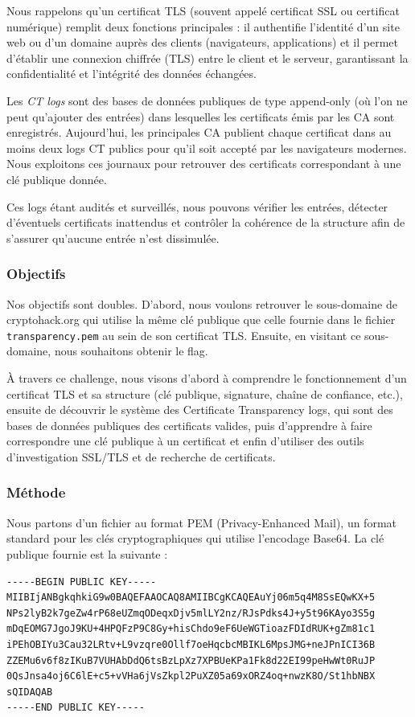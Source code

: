Nous rappelons qu'un certificat TLS (souvent appelé certificat SSL ou certificat numérique) remplit deux fonctions principales : il authentifie l'identité d'un site web ou d'un domaine auprès des clients (navigateurs, applications) et il permet d'établir une connexion chiffrée (TLS) entre le client et le serveur, garantissant la confidentialité et l'intégrité des données échangées.

Les \emph{CT logs} sont des bases de données publiques de type append-only (où l'on ne peut qu'ajouter des entrées) dans lesquelles les certificats émis par les CA sont enregistrés. Aujourd'hui, les principales CA publient chaque certificat dans au moins deux logs CT publics pour qu'il soit accepté par les navigateurs modernes. Nous exploitons ces journaux pour retrouver des certificats correspondant à une clé publique donnée.

Ces logs étant audités et surveillés, nous pouvons vérifier les entrées, détecter d'éventuels certificats inattendus et contrôler la cohérence de la structure  afin de s'assurer qu'aucune entrée n'est dissimulée.

\subsubsection{Objectifs}
Nos objectifs sont doubles. D'abord, nous voulons retrouver le sous-domaine de cryptohack.org qui utilise la même clé publique que celle fournie dans le fichier \texttt{transparency.pem} au sein de son certificat TLS. Ensuite, en visitant ce sous-domaine, nous souhaitons obtenir le flag.

À travers ce challenge, nous visons d'abord à comprendre le fonctionnement d’un certificat TLS et sa structure (clé publique, signature, chaîne de confiance, etc.), ensuite de découvrir le système des Certificate Transparency logs, qui sont des bases de données publiques des certificats valides, puis d'apprendre à faire correspondre une clé publique à un certificat et enfin d'utiliser des outils d’investigation SSL/TLS et de recherche de certificats.

\subsubsection{Méthode}
Nous partons d'un fichier au format PEM (Privacy-Enhanced Mail), un format standard pour les clés cryptographiques qui utilise l'encodage Base64. La clé publique fournie est la suivante :

\begin{verbatim}
-----BEGIN PUBLIC KEY-----
MIIBIjANBgkqhkiG9w0BAQEFAAOCAQ8AMIIBCgKCAQEAuYj06m5q4M8SsEQwKX+5
NPs2lyB2k7geZw4rP68eUZmqODeqxDjv5mlLY2nz/RJsPdks4J+y5t96KAyo3S5g
mDqEOMG7JgoJ9KU+4HPQFzP9C8Gy+hisChdo9eF6UeWGTioazFDIdRUK+gZm81c1
iPEhOBIYu3Cau32LRtv+L9vzqre0Ollf7oeHqcbcMBIKL6MpsJMG+neJPnICI36B
ZZEMu6v6f8zIKuB7VUHAbDdQ6tsBzLpXz7XPBUeKPa1Fk8d22EI99peHwWt0RuJP
0QsJnsa4oj6C6lE+c5+vVHa6jVsZkpl2PuXZ05a69xORZ4oq+nwzK8O/St1hbNBX
sQIDAQAB
-----END PUBLIC KEY-----
\end{verbatim}

